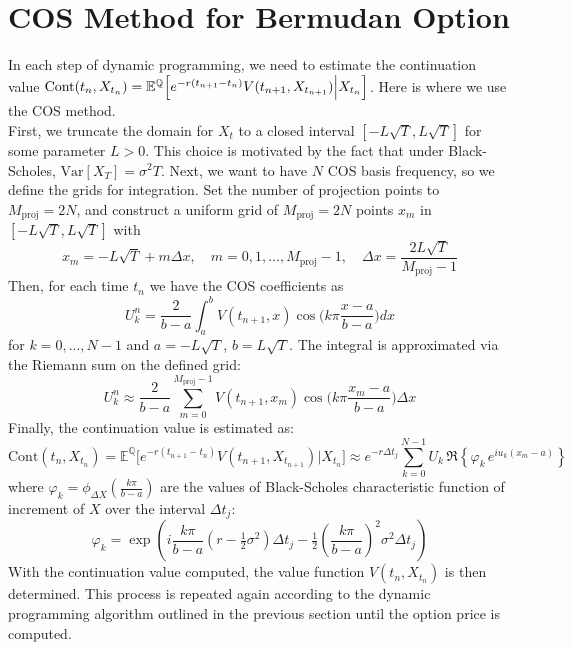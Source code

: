 \documentclass{article}
\begin{document}
\section{COS Method for Bermudan Option}
In each step of dynamic programming, we need to estimate the continuation value $\\  \text{Cont}(t_n, X_{t_n}) = \mathbb{E}^{\mathbb{Q}} \Big[ e^{-r(t_{n+1}-t_n)} V(t_{n+1}, X_{t_{n+1}}) \Big| X_{t_n}   \Big]$. Here is where we use the COS method.
\\
First, we truncate the domain for $X_t$ to a closed interval $[-L\sqrt{T}, L\sqrt{T} ]$ for some parameter $L >0$. This choice is motivated by the fact that under Black-Scholes, $\text{Var}[X_T]= \sigma^2T$. Next, we want to have $N$ COS basis frequency, so we define the grids for integration. Set the number of projection points to $M_{\text{proj}}=2N$, and construct a uniform grid of $M_{\text{proj}}=2N$ points $x_m$ in  $[-L\sqrt{T}, L\sqrt{T} ]$ with
$$
x_m= -L\sqrt{T} + m \Delta x, \quad m=0,1,...,M_{\text{proj}}-1, \quad \Delta x = \frac{2L \sqrt{T}}{M_{\text{proj}}-1} 
$$
Then, for each time $t_n$ we have the COS coefficients as
$$
U_k^{n} = \frac{2}{b-a} \int_a^b V(t_{n+1}, x) \cos \Big(k \pi \frac{x-a}{b-a} \Big) dx 
$$
for $k=0,...,N-1$ and $a=-L\sqrt{T}$, $b=L\sqrt{T}$. The integral is approximated via the Riemann sum on the defined grid:
$$
U^n_k \approx \frac{2}{b-a} \sum_{m=0}^{M_{\text{proj}}-1} V(t_{n+1}, x_m) \cos \Big(k \pi \frac{x_m-a}{b-a} \Big) \Delta x
$$
Finally, the continuation value is estimated as:
$$
\text{Cont}(t_n, X_{t_n}) = \mathbb{E}^{\mathbb{Q}} \Big[ e^{-r(t_{n+1}-t_n)} V(t_{n+1}, X_{t_{n+1}}) \Big| X_{t_n}   \Big] \approx e^{-r \Delta t_j} \sum_{k=0}^{N-1} U_k \, \Re\left\{ \varphi_k \, e^{i u_k (x_m - a)} \right\}
$$
where $\varphi_k = \phi_{\Delta X} ( \frac{k \pi}{b-a} )$ are the values of Black-Scholes characteristic function of increment of $X$ over the interval $\Delta t_j$:
$$
\varphi_k = \exp\left( i \frac{k \pi}{b-a}  \left(r - \tfrac{1}{2} \sigma^2\right) \Delta t_j - \tfrac{1}{2} (\frac{k \pi}{b-a} )^2 \sigma^2 \Delta t_j \right)
$$
With the continuation value computed, the value function $V(t_n, X_{t_n})$ is then determined. This process is repeated again according to the dynamic programming algorithm outlined in the previous section until the option price is computed.
\end{document}

